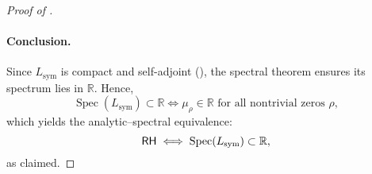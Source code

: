 \begin{proof}[Proof of ]
\paragraph*{Conclusion.}
Since \( L_{\mathrm{sym}} \) is compact and self-adjoint (), the spectral theorem ensures its spectrum lies in \( \mathbb{R} \). Hence,
\[
\operatorname{Spec}(L_{\mathrm{sym}}) \subset \mathbb{R} \iff \mu_\rho \in \mathbb{R} \text{ for all nontrivial zeros } \rho,
\]
which yields the analytic–spectral equivalence:
\[
\mathsf{RH} \iff \operatorname{Spec}(L_{\mathrm{sym}}) \subset \mathbb{R},
\]
as claimed.
\end{proof}
